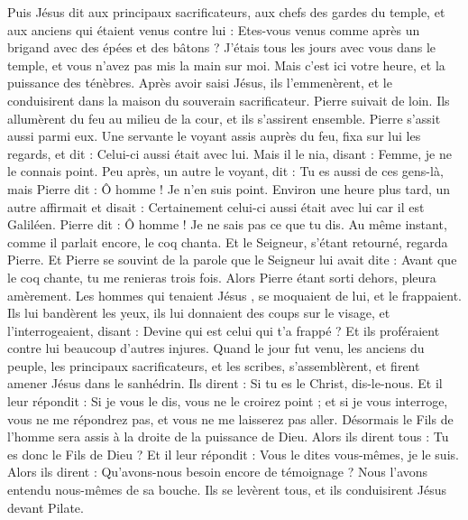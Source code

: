 \begin{multicols}{2}
{Puis Jésus dit aux principaux sacrificateurs, aux chefs des gardes du temple, et aux anciens qui étaient venus contre lui : Etes-vous venus comme après un brigand avec des épées et des bâtons ?
J’étais tous les jours avec vous dans le temple, et vous n'avez pas mis la main sur moi. Mais c'est ici votre heure, et la puissance des ténèbres.
Après avoir saisi Jésus, ils l'emmenèrent, et le conduisirent dans la maison du souverain sacrificateur. Pierre suivait de loin.
Ils allumèrent du feu au milieu de la cour, et ils s’assirent ensemble. Pierre s'assit aussi parmi eux.
Une servante le voyant assis auprès du feu, fixa sur lui les regards, et dit : Celui-ci aussi était avec lui.
Mais il le nia, disant : Femme, je ne le connais point.
Peu après, un autre le voyant, dit : Tu es aussi de ces gens-là, mais Pierre dit : Ô homme ! Je n'en suis point.
Environ une heure plus tard, un autre affirmait et disait : Certainement celui-ci aussi était avec lui car il est Galiléen.
Pierre dit : Ô homme ! Je ne sais pas ce que tu dis. Au même instant, comme il parlait encore, le coq chanta.
Et le Seigneur, s’étant retourné, regarda Pierre. Et Pierre se souvint de la parole que le Seigneur lui avait dite : Avant que le coq chante, tu me renieras trois fois.
Alors Pierre étant sorti dehors, pleura amèrement.
Les hommes qui tenaient Jésus , se moquaient de lui, et le frappaient.
Ils lui bandèrent les yeux, ils lui donnaient des coups sur le visage, et l'interrogeaient, disant : Devine qui est celui qui t'a frappé ?
Et ils proféraient contre lui beaucoup d’autres injures.
Quand le jour fut venu, les anciens du peuple, les principaux sacrificateurs, et les scribes, s'assemblèrent, et firent amener Jésus dans le sanhédrin.
Ils dirent : Si tu es le Christ, dis-le-nous. Et il leur répondit : Si je vous le dis, vous ne le croirez point ;
et si je vous interroge, vous ne me répondrez pas, et vous ne me laisserez pas aller.
Désormais le Fils de l'homme sera assis à la droite de la puissance de Dieu.
Alors ils dirent tous : Tu es donc le Fils de Dieu ? Et il leur répondit : Vous le dites vous-mêmes, je le suis.
Alors ils dirent : Qu'avons-nous besoin encore de témoignage ? Nous l'avons entendu nous-mêmes de sa bouche.
\VerseOne{}Ils se levèrent tous, et ils conduisirent Jésus devant Pilate.
}
\end{multicols}
